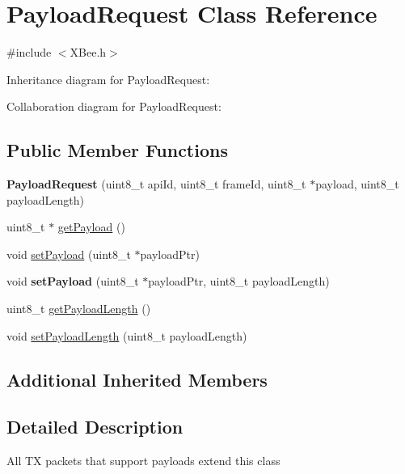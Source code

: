 \hypertarget{class_payload_request}{}\section{Payload\+Request Class Reference}
\label{class_payload_request}


{\ttfamily \#include $<$X\+Bee.\+h$>$}



Inheritance diagram for Payload\+Request\+:


Collaboration diagram for Payload\+Request\+:
\subsection*{Public Member Functions}
\begin{DoxyCompactItemize}
\item 
\hypertarget{class_payload_request_a22cc9fd971a1334346560689d7d8c8d5}{}\label{class_payload_request_a22cc9fd971a1334346560689d7d8c8d5} 
{\bfseries Payload\+Request} (uint8\+\_\+t api\+Id, uint8\+\_\+t frame\+Id, uint8\+\_\+t $\ast$payload, uint8\+\_\+t payload\+Length)
\item 
uint8\+\_\+t $\ast$ \hyperlink{class_payload_request_a1e2d5757fefda70dfd0c567b3dd0ba39}{get\+Payload} ()
\item 
void \hyperlink{class_payload_request_aa9abc1f496a1c457f796207aa8a7567d}{set\+Payload} (uint8\+\_\+t $\ast$payload\+Ptr)
\item 
\hypertarget{class_payload_request_a652f6963154003cd6e17cbcee990376a}{}\label{class_payload_request_a652f6963154003cd6e17cbcee990376a} 
void {\bfseries set\+Payload} (uint8\+\_\+t $\ast$payload\+Ptr, uint8\+\_\+t payload\+Length)
\item 
uint8\+\_\+t \hyperlink{class_payload_request_afb718d069f05611623833437c99893a4}{get\+Payload\+Length} ()
\item 
void \hyperlink{class_payload_request_a6e86a663ab6299afaa1cf21ad7c2c5c1}{set\+Payload\+Length} (uint8\+\_\+t payload\+Length)
\end{DoxyCompactItemize}
\subsection*{Additional Inherited Members}


\subsection{Detailed Description}
All TX packets that support payloads extend this class 

